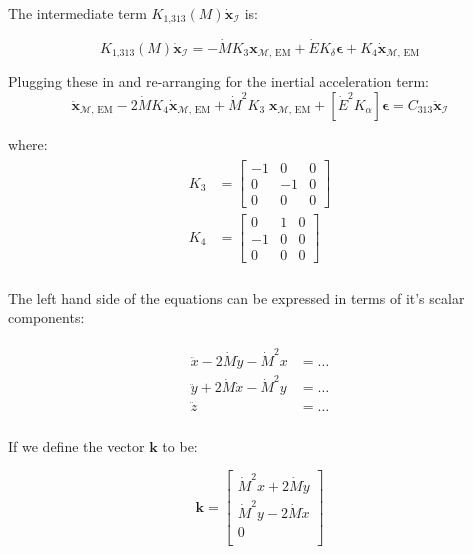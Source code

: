 \documentclass[]{article}
\begin{document}
	The intermediate term $K_\text{1,313}(M) \dot{\mathbf{x}}_\mathcal{I}$ is:
	
	\begin{equation}
		K_\text{1,313}(M) \dot{\mathbf{x}}_\mathcal{I} = -\dot{M} K_3 \mathbf{x}_{\mathcal{M}\text{, EM}} + \dot{E} K_\delta \boldsymbol{\epsilon} + K_4 \dot{\mathbf{x}}_{\mathcal{M}\text{, EM}}
	\end{equation}
	
	Plugging these in and re-arranging for the inertial acceleration term:
	\begin{equation}
		\ddot{\mathbf{x}}_{\mathcal{M}\text{, EM}} - 2 \dot{M} K_4 \dot{\mathbf{x}}_{\mathcal{M}\text{, EM}} + \dot{M}^2 K_3 \; \mathbf{x}_{\mathcal{M}\text{, EM}} + \left[ \dot{E}^2 K_\alpha \right] \boldsymbol{\epsilon}  = C_\text{313} \ddot{\mathbf{x}}_\mathcal{I} 
	\end{equation}
	
	where:
	\begin{align*}
	\begin{split}
		K_3 &= \begin{bmatrix}
			-1 & 0 & 0 \\ 0 & -1 & 0 \\ 0 & 0 & 0
		\end{bmatrix} \\
		K_4 &= \begin{bmatrix}
			0 & 1 & 0 \\ -1 & 0 & 0 \\ 0 & 0 & 0
		\end{bmatrix} \\
	\end{split}
	\end{align*}
	
	The left hand side of the equations can be expressed in terms of it's scalar components:
	
	\begin{align}
	\begin{split}
		\ddot{x} - 2\dot{M}\dot{y} - \dot{M}^2 x &= \ldots \\
		\ddot{y} + 2\dot{M}\dot{x} - \dot{M}^2 y &= \ldots \\
		\ddot{z} &= \ldots \\
	\end{split}
	\end{align}
	
	If we define the vector $\mathbf{k}$ to be:
	
	\begin{equation}
		\mathbf{k} = \begin{bmatrix}
			\dot{M}^2 x + 2\dot{M}\dot{y} \\
			\dot{M}^2 y - 2\dot{M}\dot{x} \\
			0 \\
		\end{bmatrix}
	\end{equation}
	
\end{document}
